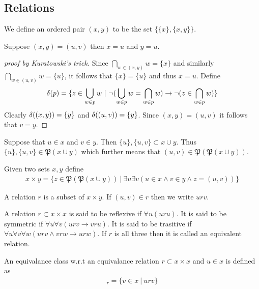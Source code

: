 \subsection{Relations}
\begin{definition}
  We define an ordered pair $(x,y)$ to be the set $\{\{x\}, \{x,y\} \}$.
\end{definition}
\begin{proposition}
  Suppose $(x,y) = (u,v)$ then $x=u$ and $y=u$.
\end{proposition}
\begin{proof}[proof by Kuratowski's trick]
  Since $\bigcap_{w\in (x,y)} w = \{x\}$ and similarly $\bigcap_{w\in (u,v)} w = \{u\}$, it follows that $\{x\}=\{u\}$ and thus $x=u$. Define
  \begin{align*}
    \delta(p) = \{z\in \bigcup_{w\in p}w\ |\ \lnot (\bigcup_{w\in p} w =\bigcap_{w\in p}w ) \to \lnot (z \in \bigcap_{w\in p}w)\}
  \end{align*}
  Clearly $\delta((x,y)) = \{y\}$ and $\delta((u,v)) = \{y\}$. Since $(x,y) = (u,v)$ it follows that $v=y$.
\end{proof}
\begin{remark}
  Suppose that $u\in x$ and $v\in y$. Then $\{u\}, \{u,v\} \subset x\cup y$. Thus $\{u\}, \{u,v\} \in \mathfrak{P} (x\cup y)$ which further means that $(u,v) \in \mathfrak{P} ( \mathfrak{P} (x\cup y))$.  
\end{remark}
\begin{definition}
  Given two sets $x,y$ define
  \begin{align*}
    x\times y = \{z\in \mathfrak{P}( \mathfrak{P} (x\cup y))\ |\ \exists u\exists v (u\in x \land v\in y \land z = (u,v))\}
  \end{align*}
\end{definition}
\begin{definition}
  A relation $r$ is a subset of $x\times y$. If $(u,v)\in r$ then we write $urv$.
\end{definition}
\begin{definition}
  A relation $r\subset x\times x$ is said to be reflexive if $\forall u (uru)$. It is said to be symmetric if $\forall u\forall v (urv \to vru)$. It is said to be trasitive if $\forall u \forall v \forall w (urv \land vrw \to urw)$. If $r$ is all three then it is called an equivalent relation.
\end{definition}
\begin{definition}
  An equivalance class w.r.t an equivalance relation $r \subset x\times x$ and $u\in x$ is defined as
  \begin{align*}
    [u]_r = \{v\in x\ |\ urv\}
  \end{align*}
\end{definition}
